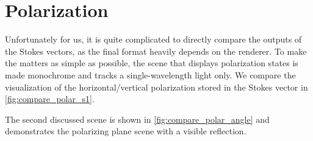 \section{Polarization}

Unfortunately for us, it is quite complicated to directly compare the outputs of the Stokes vectors, as the final format heavily depends on the renderer. To make the matters as simple as possible, the scene that displays polarization states is made monochrome and tracks a single-wavelength light only. We compare the visualization of the horizontal/vertical polarization stored in the Stokes vector in \autoref{fig:compare_polar_s1}. 

The second discussed scene is shown in \autoref{fig:compare_polar_angle} and demonstrates the polarizing plane scene with a visible reflection.

